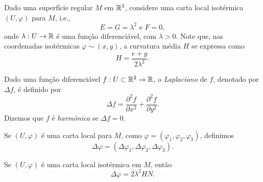 Dado uma superfície regular $M$ em $\mathbb{R}^3$, considere uma carta local isotérmica $(U,\varphi)$ para $M$, i.e., 
\begin{equation*}
E = G = \lambda^2 \text{ e } F=0,
\end{equation*}
onde $\lambda: U \rightarrow \mathbb{R}$ é uma função diferenciável, com $\lambda > 0$. Note que, nas coordenadas isotérmicas $\varphi \sim (x,y)$, a curvatura média $H$ se expressa como
\begin{equation*}
H = \frac{e + g}{2 \lambda^2}.
\end{equation*}

\begin{definicao}
	Dado uma função diferenciável $f: U \subset \mathbb{R}^2 \rightarrow \mathbb{R}$, o \emph{Laplaciano} de $f$, denotado por $\Delta f$, é definido por
	\begin{equation*}
	\Delta f = \frac{\partial^2 f}{\partial x^2} + \frac{\partial^2 f}{\partial y^2}.
	\end{equation*}
	Dizemos que $f$ é \emph{harmônica} se $\Delta f = 0$.
	
	Se $(U, \varphi)$ é uma carta local para $M$, como $\varphi = (\varphi_1, \varphi_2, \varphi_3)$, definimos
	\begin{equation*}
	\Delta \varphi = (\Delta \varphi_1, \Delta \varphi_2, \Delta \varphi_3).
	\end{equation*}
\end{definicao}

\begin{proposicao}
	Se $(U, \varphi)$ é uma carta local isotérmica em $M$, então 
	\begin{equation*}
	\Delta \varphi = 2 \lambda^2 H N.
	\end{equation*}
\end{proposicao}


